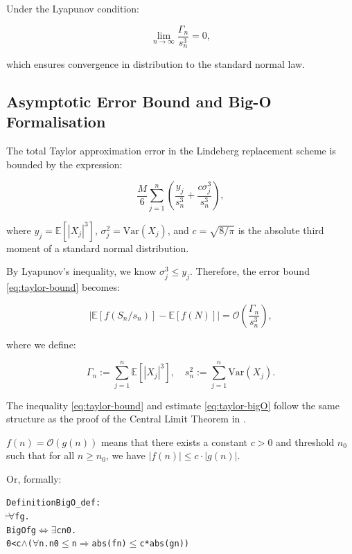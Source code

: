 Under the Lyapunov condition:

\[
\lim_{n \to \infty} \frac{\Gamma_n}{s_n^3} = 0,
\]

which ensures convergence in distribution to the standard normal law.

\subsection{Asymptotic Error Bound and Big-O Formalisation}

The total Taylor approximation error in the Lindeberg replacement scheme is bounded by the expression:

\begin{equation}
\label{eq:taylor-bound}
\frac{M}{6} \sum_{j = 1}^{n} \left( \frac{y_j}{s_n^3} + \frac{c \sigma_j^3}{s_n^3} \right),
\end{equation}

where \( y_j = \mathbb{E}[|X_j|^3] \), \( \sigma_j^2 = \text{Var}(X_j) \), and \( c = \sqrt{8/\pi} \) is the absolute third moment of a standard normal distribution.

By Lyapunov’s inequality, we know \( \sigma_j^3 \le y_j \). Therefore, the error bound \eqref{eq:taylor-bound} becomes:

\begin{equation} \label{eq:taylor-bigO}
\left| \mathbb{E}[f(S_n / s_n)] - \mathbb{E}[f(N)] \right| = \mathcal{O}\left( \frac{\Gamma_n}{s_n^3} \right),
\end{equation}

where we define:

\[
\Gamma_n := \sum_{j=1}^n \mathbb{E}[|X_j|^3],
\quad
s_n^2 := \sum_{j=1}^n \mathrm{Var}(X_j).
\]

The inequality \eqref{eq:taylor-bound} and estimate \eqref{eq:taylor-bigO} follow the same structure as the proof of the Central Limit Theorem in \cite{Chung:2001}.

\begin{definition}
 \( f(n) = \mathcal{O}(g(n)) \) means that there exists a constant \( c > 0 \) and threshold \( n_0 \) such that for all \( n \ge n_0 \), we have \( |f(n)| \le c \cdot |g(n)| \).
\end{definition}

Or, formally:
\begin{hol}
\begin{alltt}
Definition BigO\_def :
\(\!\!\!{\turn}\!\!\!\!\) \(\forall\)f g.
BigO f g \(\Leftrightarrow\) \(\exists\)c n0.
0 < c \(\land\) (\(\forall\)n. n0 \(\le\) n \(\Rightarrow\) abs (f n) \(\le\) c * abs (g n))
\end{alltt}
\end{hol}


